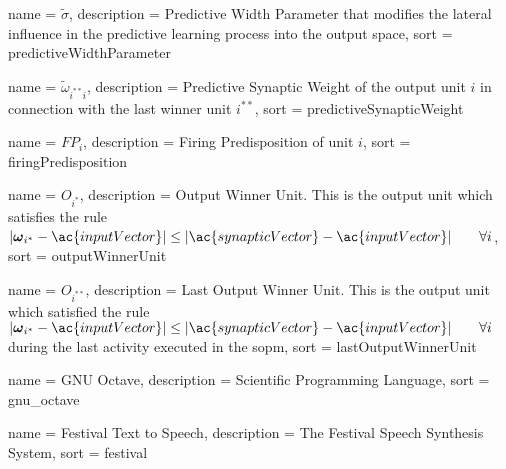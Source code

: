 {
  name = {\ensuremath{\tilde{\sigma}}},
  description = {Predictive Width Parameter that modifies the lateral influence in the predictive learning process into the output space},
  sort  = predictiveWidthParameter
}

{
  name = {\ensuremath{\tilde{\omega}_{i^{**}i}}},
  description = {Predictive Synaptic Weight of the output unit $i$ in connection with the last winner unit $i^{**}$},
  sort  = predictiveSynapticWeight
}

{
  name = {\ensuremath{FP_i}},
  description = {Firing Predisposition of unit $i$},
  sort  = firingPredisposition
}

{
  name = {\ensuremath{O_{i^*}}},
  description = {Output Winner Unit. This is the output unit which satisfies the rule $|\boldsymbol{\omega}_{i^*} - \ac{inputVector}| \leq |\ac{synapticVector} - \ac{inputVector}| \quad \quad \forall i$},
  sort  = outputWinnerUnit
}

{
  name = {\ensuremath{O_{i^{**}}}},
  description = {Last Output Winner Unit. This is the output unit which satisfied the rule $|\boldsymbol{\omega}_{i^*} - \ac{inputVector}| \leq |\ac{synapticVector} - \ac{inputVector}| \quad \quad \forall i$ during the last activity executed in the \ac{sopm}},
  sort  = lastOutputWinnerUnit
}

{
  name = {GNU Octave},
  description = {Scientific Programming Language},
  sort  = gnu_octave
}

{
  name = {Festival Text to Speech},
  description = {The Festival Speech Synthesis System},
  sort  = festival
}


